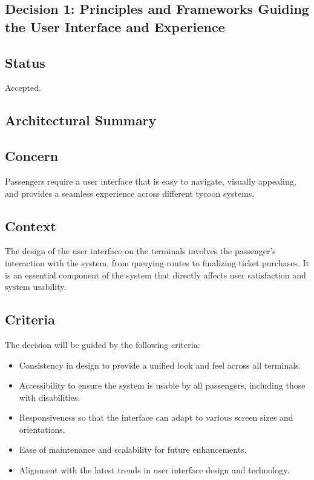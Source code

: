 \subsection{Decision 1: Principles and Frameworks Guiding the User Interface and Experience}

\subsection*{Status}
Accepted.

\subsection*{Architectural Summary}

\subsection*{Concern}
Passengers require a user interface that is easy to navigate, visually appealing, and provides a seamless experience across different tycoon systems.

\subsection*{Context}
The design of the user interface on the terminals involves the passenger's interaction with the system, from querying routes to finalizing ticket purchases. It is an essential component of the system that directly affects user satisfaction and system usability.

\subsection*{Criteria}
The decision will be guided by the following criteria:
\begin{itemize}
    \item Consistency in design to provide a unified look and feel across all terminals.
    \item Accessibility to ensure the system is usable by all passengers, including those with disabilities.
    \item Responsiveness so that the interface can adapt to various screen sizes and orientations.
    \item Ease of maintenance and scalability for future enhancements.
    \item Alignment with the latest trends in user interface design and technology.
\end{itemize}

